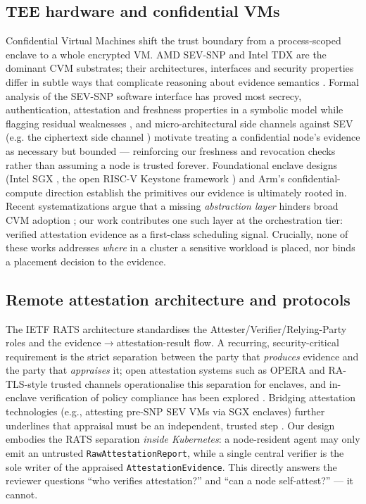\subsection{TEE hardware and confidential VMs}
Confidential Virtual Machines shift the trust boundary from a process-scoped
enclave to a whole encrypted VM. AMD SEV-SNP and Intel TDX are the dominant CVM
substrates; their architectures, interfaces and security properties differ in
subtle ways that complicate reasoning about evidence semantics
\cite{misono2024cvms,cheng2023tdx}. Formal analysis of the SEV-SNP software
interface has proved most secrecy, authentication, attestation and freshness
properties in a symbolic model while flagging residual weaknesses
\cite{paradzik2024sevsnp}, and micro-architectural side channels against SEV
(e.g. the ciphertext side channel \cite{li2021cipherleaks}) motivate treating a
confidential node's evidence as necessary but bounded --- reinforcing our
freshness and revocation checks rather than assuming a node is trusted forever. Foundational enclave designs (Intel SGX
\cite{costan2016sgx}, the open RISC-V Keystone framework \cite{lee2020keystone})
and Arm's confidential-compute direction \cite{xu2023virtcca,cerdeira2022rezone}
establish the primitives our evidence is ultimately rooted in. Recent
systematizations argue that a missing \emph{abstraction layer} hinders broad CVM
adoption \cite{michaud2025teesok}; our work contributes one such layer at the
orchestration tier: verified attestation evidence as a first-class scheduling
signal. Crucially, none of these works addresses \emph{where} in a cluster a
sensitive workload is placed, nor binds a placement decision to the evidence.

\subsection{Remote attestation architecture and protocols}
The IETF RATS architecture \cite{birkholz2023rats} standardises the
Attester/Verifier/Relying-Party roles and the evidence$\rightarrow$attestation-result
flow. A recurring, security-critical requirement is the strict separation between
the party that \emph{produces} evidence and the party that \emph{appraises} it;
open attestation systems such as OPERA \cite{chen2019opera} and RA-TLS-style
trusted channels \cite{knauth2018ratls,akama2024raweb} operationalise this
separation for enclaves, and in-enclave verification of policy compliance has
been explored \cite{liu2020confidattest}. Bridging attestation technologies
(e.g., attesting pre-SNP SEV VMs via SGX enclaves) further underlines that
appraisal must be an independent, trusted step \cite{antonino2023flexattest}.
Our design embodies the RATS separation \emph{inside Kubernetes}: a
node-resident agent may only emit an untrusted \texttt{RawAttestationReport},
while a single central verifier is the sole writer of the appraised
\texttt{AttestationEvidence}. This directly answers the reviewer questions
``who verifies attestation?'' and ``can a node self-attest?'' --- it cannot.

